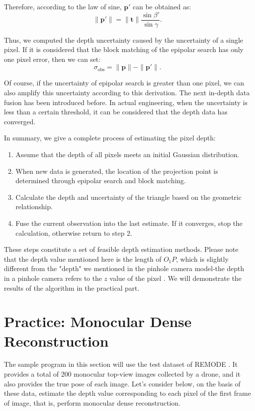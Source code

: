 Therefore, according to the law of sine, $\bm{p}'$ can be obtained as:
\begin{equation}
	\| \bm{p}' \| = \| \bm{t} \| \frac{{\sin \beta '}}{{\sin \gamma }}.
\end{equation}

Thus, we computed the depth uncertainty caused by the uncertainty of a single pixel. If it is considered that the block matching of the epipolar search has only one pixel error, then we can set:
\begin{equation}
	\sigma_{\mathrm{obs}} = \| \bm{p} \|-\| \bm{p}' \|.
\end{equation}

Of course, if the uncertainty of epipolar search is greater than one pixel, we can also amplify this uncertainty according to this derivation. The next in-depth data fusion has been introduced before. In actual engineering, when the uncertainty is less than a certain threshold, it can be considered that the depth data has converged.

In summary, we give a complete process of estimating the pixel depth:
\begin{mdframed}
\begin{enumerate}
	\item Assume that the depth of all pixels meets an initial Gaussian distribution.
	\item When new data is generated, the location of the projection point is determined through epipolar search and block matching.
	\item Calculate the depth and uncertainty of the triangle based on the geometric relationship.
	\item Fuse the current observation into the last estimate. If it converges, stop the calculation, otherwise return to step 2.
\end{enumerate}
\end{mdframed}

These steps constitute a set of feasible depth estimation methods. Please note that the depth value mentioned here is the length of $O_1 P$, which is slightly different from the "depth" we mentioned in the pinhole camera model-the depth in a pinhole camera refers to the $z$ value of the pixel . We will demonstrate the results of the algorithm in the practical part.

\section{Practice: Monocular Dense Reconstruction}
The sample program in this section will use the test dataset of REMODE {\cite{Handa2012, Pizzoli2014}}. It provides a total of 200 monocular top-view images collected by a drone, and it also provides the true pose of each image. Let's consider below, on the basis of these data, estimate the depth value corresponding to each pixel of the first frame of image, that is, perform monocular dense reconstruction.

